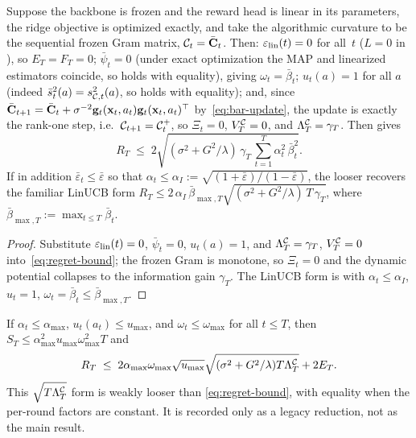 \begin{corollary}\label{cor:frozen}
Suppose the backbone is frozen and the reward head is linear in its
parameters, the ridge objective is optimized exactly, and take the algorithmic curvature to be the sequential frozen
Gram matrix, $\mathcal{C}_t=\bar{\mathbf{C}}_t$.  Then:
$\varepsilon_{\mathrm{lin}}(t)=0$ for all~$t$ ($L=0$ in ), so $E_T=F_T=0$;
$\bar\psi_t=0$ (under exact optimization the MAP and linearized estimators coincide, so
 holds with equality), giving $\omega_t=\bar\beta_t$;
$u_t(a)=1$ for all $a$ (indeed $\bar s_t^2(a)=s_{\mathcal{C},t}^2(a)$, so
 holds with equality); and, since
$\bar{\mathbf{C}}_{t+1}=\bar{\mathbf{C}}_t+\sigma^{-2}\mathbf{g}_t(\mathbf{x}_t,a_t)\mathbf{g}_t(\mathbf{x}_t,a_t)^\top$
by~\eqref{eq:bar-update}, the update is exactly the rank-one step, i.e.\
$\mathcal{C}_{t+1}=\mathcal{C}_t^{+}$, so $\Xi_t=0$, $V^{\mathcal{C}}_T=0$, and
$\Lambda^{\mathcal{C}}_T=\gamma_T$.  Then  gives
\[
  R_T
  \;\le\;
  2\sqrt{(\sigma^2+G^2/\lambda)\,\gamma_T\,
    \sum_{t=1}^T \alpha_t^2\,\bar\beta_t^2}.
\]
If in addition $\bar\varepsilon_t\le\bar\varepsilon$ so that
$\alpha_t\le\alpha_I:=\sqrt{(1+\bar\varepsilon)/(1-\bar\varepsilon)}$, the
looser \Cref{cor:worstcase} recovers the familiar LinUCB form
$R_T\le 2\,\alpha_I\,\bar\beta_{\max,T}\sqrt{(\sigma^2+G^2/\lambda)\,T\,\gamma_T}$,
where $\bar\beta_{\max,T}:=\max_{t\le T}\bar\beta_t$.
\end{corollary}
\begin{proof}
Substitute $\varepsilon_{\mathrm{lin}}(t)=0$, $\bar\psi_t=0$, $u_t(a)=1$, and
$\Lambda^{\mathcal{C}}_T=\gamma_T$, $V^{\mathcal{C}}_T=0$ into~\eqref{eq:regret-bound}; the frozen
Gram is monotone, so $\Xi_t=0$ and the dynamic potential collapses to the
information gain $\gamma_T$.  The LinUCB form is \Cref{cor:worstcase} with
$\alpha_t\le\alpha_I$, $u_t=1$, $\omega_t=\bar\beta_t\le\bar\beta_{\max,T}$.
\end{proof}

\begin{corollary}\label{cor:worstcase}
If $\alpha_t\le\alpha_{\max}$, $u_t(a_t)\le u_{\max}$, and
$\omega_t\le\omega_{\max}$ for all $t\le T$, then
$S_T\le\alpha_{\max}^2 u_{\max}\omega_{\max}^2T$ and
\[
  R_T \;\le\; 2\alpha_{\max}\omega_{\max}\sqrt{u_{\max}}
  \sqrt{(\sigma^2+G^2/\lambda)T\Lambda^{\mathcal{C}}_T}+2E_T .
\]
This $\sqrt{T\Lambda^{\mathcal{C}}_T}$ form is weakly looser than
\eqref{eq:regret-bound}, with equality when the per-round factors are constant.
It is recorded only as a legacy reduction, not as the main result.
\end{corollary}
